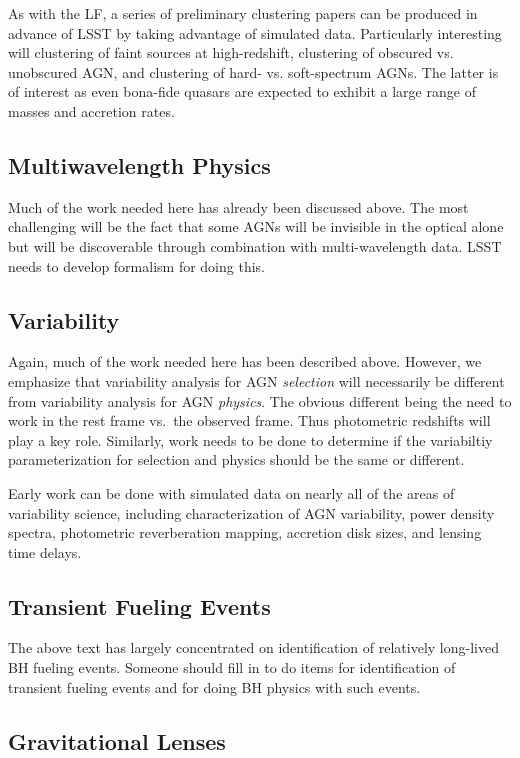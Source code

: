 As with the LF, a series of preliminary clustering papers can be produced in advance of LSST by taking advantage of simulated data.  Particularly interesting will clustering of faint sources at high-redshift, clustering of obscured vs. unobscured AGN, and clustering of hard- vs. soft-spectrum AGNs.  The latter is of interest as even bona-fide quasars are expected to exhibit a large range of masses and accretion rates.


\subsection{Multiwavelength Physics}

Much of the work needed here has already been discussed above.  The most challenging will be the fact that some AGNs will be invisible in the optical alone but will be discoverable through combination with multi-wavelength data.  LSST needs to develop formalism for doing this.

\subsection{Variability}

Again, much of the work needed here has been described above.  However, we emphasize that variability analysis for AGN {\em selection} will necessarily be different from variability analysis for AGN {\em physics}.  The obvious different being the need to work in the rest frame vs.\ the observed frame.  Thus photometric redshifts will play a key role.  Similarly, work needs to be done to determine if the variabiltiy parameterization for selection and physics should be the same or different.

Early work can be done with simulated data on nearly all of the areas of variability science, including characterization of AGN variability, power density spectra, photometric reverberation mapping, accretion disk sizes, and lensing time delays.

\subsection{Transient Fueling Events}

The above text has largely concentrated on identification of relatively long-lived BH fueling events.  Someone should fill in to do items for identification of transient fueling events and for doing BH physics with such events.

\subsection{Gravitational Lenses}

